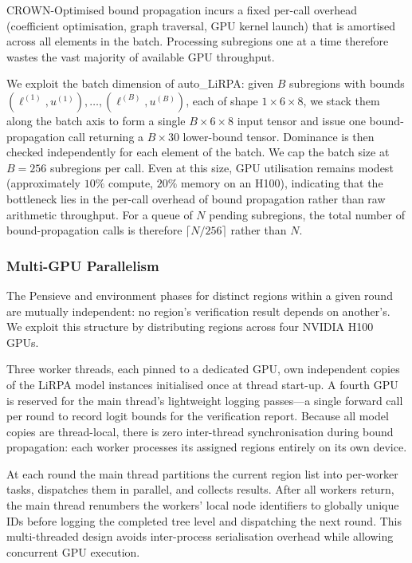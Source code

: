 \documentclass[thesis]{uofithesis} %
\begin{document}
    CROWN-Optimised bound propagation incurs a fixed per-call overhead
    (coefficient optimisation, graph traversal, GPU kernel launch) that is
    amortised across all elements in the batch.  Processing subregions one
    at a time therefore wastes the vast majority of available GPU
    throughput.

    We exploit the batch dimension of auto\_LiRPA: given $B$
    subregions with bounds $(\ell^{(1)}, u^{(1)}), \ldots,
    (\ell^{(B)}, u^{(B)})$, each of shape $1 \times 6 \times 8$, we stack
    them along the batch axis to form a single $B \times 6 \times 8$
    input tensor and issue one bound-propagation call returning a
    $B \times 30$ lower-bound tensor.  Dominance is then checked
    independently for each element of the batch.
    We cap the batch size at $B = 256$ subregions per call.  Even at this
    size, GPU utilisation remains modest (approximately $10\%$ compute,
    $20\%$ memory on an H100), indicating that the bottleneck lies in the
    per-call overhead of bound propagation rather than raw arithmetic
    throughput.  For a queue of $N$ pending subregions, the
    total number of bound-propagation calls is therefore
    $\lceil N / 256 \rceil$ rather than $N$.


    \subsubsection{Multi-GPU Parallelism}
    \label{sec:verify-multigpu}

    The Pensieve and environment phases for distinct regions within a given
    round are mutually independent: no region's verification result depends
    on another's.  We exploit this structure by distributing regions across
    four NVIDIA H100 GPUs.

    Three worker threads, each pinned to a dedicated GPU, own independent
    copies of the LiRPA model instances initialised once at thread
    start-up.  A fourth GPU is reserved for the main thread's lightweight
    logging passes---a single forward call per round to record logit
    bounds for the verification report.  Because all model copies are
    thread-local, there is zero inter-thread synchronisation during bound
    propagation: each worker processes its assigned regions entirely on
    its own device.

    At each round the main thread partitions the current region list into
    per-worker tasks, dispatches them in parallel, and collects results.
    After all workers return, the main thread renumbers the workers' local
    node identifiers to globally unique IDs before logging the completed tree level
    and dispatching the next round.  This multi-threaded design avoids
    inter-process serialisation overhead while allowing concurrent GPU
    execution.
\end{document}
